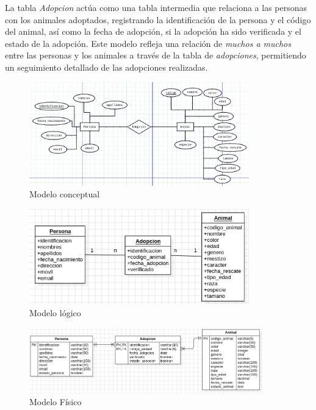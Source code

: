 \documentclass[12pt]{article}
\begin{document}
                        La tabla \textit{Adopcion} actúa como una tabla intermedia que relaciona a las personas con los animales adoptados, registrando la identificación de la persona y el código del animal, así como la fecha de adopción, si la adopción ha sido verificada y el estado de la adopción. Este modelo refleja una relación de \textit{muchos a muchos} entre las personas y los animales a través de la tabla de \textit{adopciones}, permitiendo un seguimiento detallado de las adopciones realizadas.
                        
                        \begin{figure}[!h]
                                \centering
                                \includegraphics[width=0.85\textwidth]{img/ej1-1.png}
                                \caption{Modelo conceptual}
                        \end{figure}

                        \newpage
                        \begin{figure}[!h]
                                \centering
                                \includegraphics[width=0.85\textwidth]{img/ej1-2.png}
                                \caption{Modelo lógico}
                        \end{figure}

                        \begin{figure}[!h]
                                \centering
                                \includegraphics[width=0.9\textwidth]{img/ej1-3.png}
                                \caption{Modelo Físico}
                        \end{figure}
    
\end{document}
